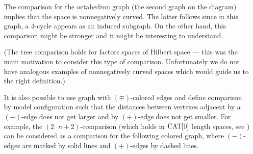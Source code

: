 \hide
\begin{center}
\hskip30mm
\end{center}
\unhide

The comparison for the octahedron graph (the second graph on the diagram) implies that the space is nonnegatively curved.
The latter follows since in this graph, a 4-cycle appears as an induced subgraph.
On the other hand, this comparison might be stronger and it might be interesting to understand.

(The tree comparison holds for factors spaces of Hilbert space --- this was the main motivation to consider this type of comparison. 
Unfortunately we do not have analogous examples of nonnegatively curved spaces which would guide us to the right definition.)

It is also possible to use graph with $(\mp)$-colored edges and define comparison by model configuration such that the distances between vertexes adjacent by a $(-)$-edge does not get larger and by $(+)$-edge does not get smaller.
For example, the $(2{\cdot}n+2)$-comparison (which holds in $\mathop{\rm CAT}\nolimits[0]$ length spaces, see \cite{AKP}) can be considered as a comparison for the following colored graph, where $(-)$-edges are marked by solid lines and $(+)$-edges by dashed lines.


